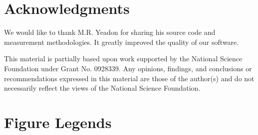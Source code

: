\documentclass[10pt]{article}
\begin{document}
\section*{Acknowledgments}
We would like to thank M.R. Yeadon for sharing his source code and measurement
methodologies. It greatly improved the quality of our software.

This material is partially based upon work supported by the National Science
Foundation under Grant No. 0928339. Any opinions, findings, and conclusions or
recommendations expressed in this material are those of the author(s) and do
not necessarily reflect the views of the National Science Foundation.



\section*{Figure Legends}
\end{document}
